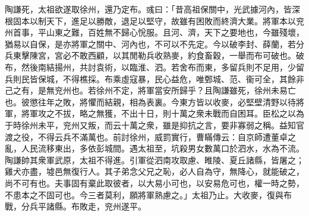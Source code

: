 \begin{pinyinscope}
陶謙死，太祖欲遂取徐州，還乃定布。彧曰：「昔高祖保關中，光武據河內，皆深根固本以制天下，進足以勝敵，退足以堅守，故雖有困敗而終濟大業。將軍本以兖州首事，平山東之難，百姓無不歸心恱服。且河、濟，天下之要地也，今雖殘壞，猶易以自保，是亦將軍之關中、河內也，不可以不先定。今以破李封、薛蘭，若分兵東擊陳宮，宮必不敢西顧，以其閒勒兵收熟麥，約食畜穀，一舉而布可破也。破布，然後南結揚州，共討袁術，以臨淮、泗。若舍布而東，多留兵則不足用，少留兵則民皆保城，不得樵採。布乘虛寇暴，民心益危，唯鄄城、范、衞可全，其餘非己之有，是無兖州也。若徐州不定，將軍當安所歸乎？且陶謙雖死，徐州未易亡也。彼懲往年之敗，將懼而結親，相為表裏。今東方皆以收麥，必堅壁清野以待將軍，將軍攻之不拔，略之無獲，不出十日，則十萬之衆未戰而自困耳。臣松之以為于時徐州未平，兖州又叛，而云十萬之衆，雖是抑抗之言，要非寡弱之稱。益知官渡之役，不得云兵不滿萬也。前討徐州，威罰實行，曹瞞傳云：自京師遭董卓之亂，人民流移東出，多依彭城間。遇太祖至，坑殺男女數萬口於泗水，水為不流。陶謙帥其衆軍武原，太祖不得進。引軍從泗南攻取慮、睢陵、夏丘諸縣，皆屠之；雞犬亦盡，墟邑無復行人。其子弟念父兄之恥，必人自為守，無降心，就能破之，尚不可有也。夫事固有棄此取彼者，以大易小可也，以安易危可也，權一時之勢，不患本之不固可也。今三者莫利，願將軍熟慮之。」太祖乃止。大收麥，復與布戰，分兵平諸縣。布敗走，兖州遂平。


\end{pinyinscope}
